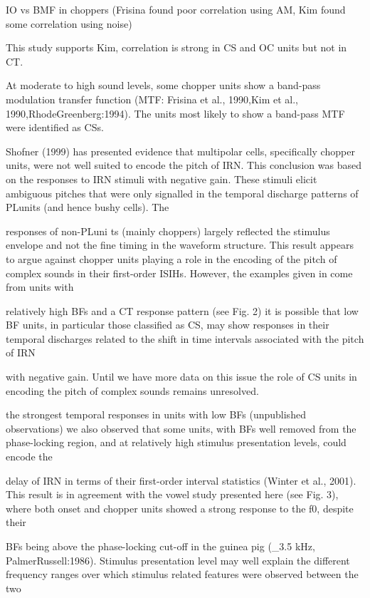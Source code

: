 \documentclass[10pt,a4paper]{article}
\begin{document}
IO vs BMF in choppers (Frisina found poor correlation using AM, Kim found some
correlation using noise)

This study supports Kim, correlation is strong in CS and OC units but not in CT.

At moderate to high sound levels, some chopper units show a band-pass modulation
transfer function (MTF: Frisina et al., 1990,Kim et al.,
1990,RhodeGreenberg:1994). The units most likely to show a band-pass MTF were
identified as CSs.

Shofner (1999) has presented evidence that multipolar cells, specifically
chopper units, were not well suited to encode the pitch of IRN. This conclusion
was based on the responses to IRN stimuli with negative gain. These stimuli
elicit ambiguous pitches that were only signalled in the temporal discharge
patterns of PLunits (and hence bushy cells). The

responses of non-PLuni ts (mainly choppers) largely reflected the stimulus
envelope and not the fine timing in the waveform structure.  This result appears
to argue against chopper units playing a role in the encoding of the pitch of
complex sounds in their first-order ISIHs.  However, the examples given in
\citep{Shofner:1999} come from units with

relatively high BFs and a CT response pattern (see Fig. 2) it is possible that
low BF units, in particular those classified as CS, may show responses in their
temporal discharges related to the shift in time intervals associated with the
pitch of IRN

with negative gain. Until we have more data on this issue the role of CS units
in encoding the pitch of complex sounds remains unresolved.

the strongest temporal responses in units with low BFs (unpublished
observations) we also observed that some units, with BFs well removed from the
phase-locking region, and at relatively high stimulus presentation levels, could
encode the

delay of IRN in terms of their first-order interval statistics (Winter et al.,
2001). This result is in agreement with the vowel study presented here (see
Fig. 3), where both onset and chopper units showed a strong response to the f0,
despite their

BFs being above the phase-locking cut-off in the guinea pig (\_3.5 kHz,
PalmerRussell:1986). Stimulus presentation level may well explain the different
frequency ranges over which stimulus related features were observed between the
two
\end{document}
